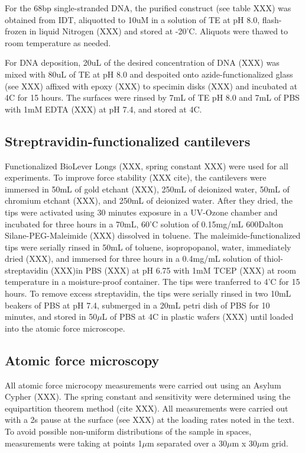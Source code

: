 \documentclass[%
  aip,12pt,tightenlines,
  amsthm,
 amsmath,amssymb,
 reprint,%
]{revtex4-1}
\newcommand{\sLabel}[1]{\label{section:#1}}
\newcommand{\firstp}[0]{\noindent}
\newcommand{\pl}[0]{\vspace{6pt}}
\begin{document}
For the 68bp single-stranded DNA, the purified construct (see table XXX) was obtained from IDT, aliquotted to 10uM in a solution of TE at pH 8.0, flash-frozen in liquid Nitrogen (XXX) and stored at -20'C. Aliquots were thawed to room temperature as needed. \pl 

For DNA deposition, 20uL of the desired concentration of DNA (XXX) was mixed with 80uL of TE at pH 8.0 and despoited onto azide-functionalized glass (see XXX) affixed with epoxy (XXX) to specimin disks (XXX) and incubated at 4C for 15 hours. The surfaces were rinsed by 7mL of TE pH 8.0 and 7mL of PBS with 1mM EDTA (XXX) at pH 7.4, and stored at 4C. 

\subsection{\sLabel{Cantilevers}Streptravidin-functionalized cantilevers}

\firstp Functionalized BioLever Longs (XXX, spring constant XXX) were used for all experiments. To improve force stability (XXX cite), the cantilevers were immersed in 50mL of gold etchant (XXX), 250mL of deionized water, 50mL of chromium etchant (XXX), and 250mL of deionized water. After they dried, the tips were activated using 30 minutes exposure in a UV-Ozone chamber and incubated for three hours in a 70mL, 60'C solution of 0.15mg/mL 600Dalton Silane-PEG-Maleimide (XXX) dissolved in toluene. The maleimide-functionalized tips were serially rinsed in 50mL of toluene, isopropopanol, water, immediately dried (XXX), and immersed for three hours in a 0.4mg/mL solution of thiol-streptavidin (XXX)in PBS (XXX) at pH 6.75 with 1mM TCEP (XXX) at room temperature in a moisture-proof container. The tips were tranferred to 4'C for 15 hours. To remove excess streptavidin, the tips were serially rinsed in two 10mL beakers of PBS at pH 7.4, submerged in a 20mL petri dish of PBS for 10 minutes, and stored in 50$\mu$L of PBS at 4C in plastic wafers (XXX) until loaded into the atomic force microscope. \pl

\subsection{\sLabel{Surface}Atomic force microscopy}

All atomic force microcopy measurements were carried out using an Asylum Cypher (XXX). The spring constant and sensitivity were determined using the equipartition theorem method (cite XXX). All measurements were carried out with a 2s pause at the surface (see XXX) at the loading rates noted in the text. To avoid possible non-uniform distributions of the sample in spaces, measurements were taking at points 1$\mu$m separated over a 30$\mu$m x 30$\mu$m grid. 
\end{document}
